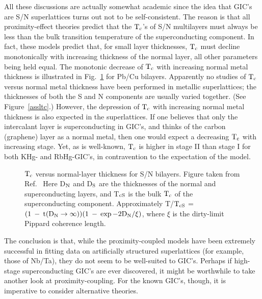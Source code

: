         All these discussions are actually somewhat academic since the idea
that GIC's are S/N superlattices turns out not to  be self-consistent.  The
reason  is  that all  proximity-effect theories\cite{cooper61,takahashi86b}
predict that the $\rm  T_c$'s of S/N  multilayers must always be  less than
the bulk transition temperature of the superconducting component.  In fact,
these models  predict that,   for small layer  thicknesses, $\rm  T_c$ must
decline  monotonically  with increasing thickness  of the normal layer, all
other parameters being held  equal.   The monotonic  decrease of  $\rm T_c$
with increasing normal metal thickness is illustrated in Fig.~\ref{proxeff}
for  Pb/Cu bilayers.\cite{werthamer63} Apparently no  studies of $\rm  T_c$
versus normal  metal       thickness  have been    performed   in  metallic
superlattices; the thicknesses of  both the S  and N components are usually
varied together.  (See   Figure~\ref{assltc}.)  However, the  depression of
$\rm T_c$ with increasing normal  metal  thickness is also  expected in the
superlattices.   If   one  believes that  only  the  intercalant layer   is
superconducting in GIC's,  and thinks  of the carbon  (graphene) layer as a
normal metal, then one would expect a decreasing $\rm T_c$  with increasing
stage.  Yet, as is well-known, $\rm T_c$ is higher in stage II than stage I
for   both  KHg-   and  RbHg-GIC's,\cite{iye83}  in  contravention   to the
expectation of the model.

\begin{figure}
\vspace{5in}
\caption[$\rm T_c$ versus layer thickness  for S/N bilayers.]{$\rm T_c$ versus normal-layer thickness  for S/N bilayers.
Figure taken from Ref.~\cite{werthamer63} Here D$\rm  _N$ and D$\rm _S$ are the
thicknesses of the normal and  superconducting layers, and T$\rm  _{cS}$ is
the bulk $\rm T_c$  of the superconducting component.  Approximately T/$\rm
T_{cS}$  =  $\rm  (1  \: -   \:  t(D_N \rightarrow    \infty))(1  \:  -  \:
\exp{-2D_N/\xi})$, where $\xi$ is the dirty-limit Pippard coherence length.}
\label{proxeff}
\end{figure}

        The  conclusion  is that,  while the  proximity-coupled models have
been extremely  successful   in  fitting  data on  artificially  structured
superlattices (for example, those of  Nb/Ta\cite{broussard88}), they do not
seem to  be well-suited  to  GIC's.  Perhaps if  high-stage superconducting
GIC's are ever discovered, it might be worthwhile  to  take another look at
proximity-coupling.   For  the known  GIC's, though,   it is  imperative to
consider alternative theories.

